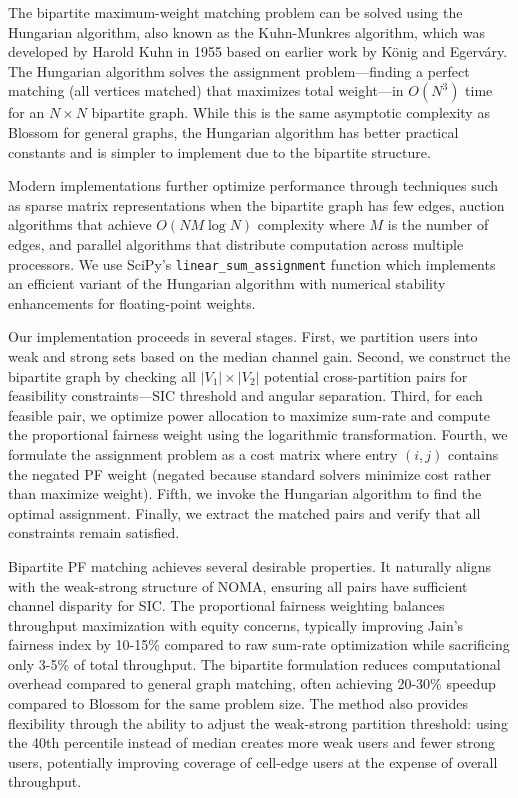 The bipartite maximum-weight matching problem can be solved using the Hungarian algorithm, also known as the Kuhn-Munkres algorithm, which was developed by Harold Kuhn in 1955 based on earlier work by König and Egerváry. The Hungarian algorithm solves the assignment problem—finding a perfect matching (all vertices matched) that maximizes total weight—in $O(N^3)$ time for an $N \times N$ bipartite graph. While this is the same asymptotic complexity as Blossom for general graphs, the Hungarian algorithm has better practical constants and is simpler to implement due to the bipartite structure.

Modern implementations further optimize performance through techniques such as sparse matrix representations when the bipartite graph has few edges, auction algorithms that achieve $O(NM \log N)$ complexity where $M$ is the number of edges, and parallel algorithms that distribute computation across multiple processors. We use SciPy's \texttt{linear\_sum\_assignment} function which implements an efficient variant of the Hungarian algorithm with numerical stability enhancements for floating-point weights.

Our implementation proceeds in several stages. First, we partition users into weak and strong sets based on the median channel gain. Second, we construct the bipartite graph by checking all $|V_1| \times |V_2|$ potential cross-partition pairs for feasibility constraints—SIC threshold and angular separation. Third, for each feasible pair, we optimize power allocation to maximize sum-rate and compute the proportional fairness weight using the logarithmic transformation. Fourth, we formulate the assignment problem as a cost matrix where entry $(i,j)$ contains the negated PF weight (negated because standard solvers minimize cost rather than maximize weight). Fifth, we invoke the Hungarian algorithm to find the optimal assignment. Finally, we extract the matched pairs and verify that all constraints remain satisfied.

Bipartite PF matching achieves several desirable properties. It naturally aligns with the weak-strong structure of NOMA, ensuring all pairs have sufficient channel disparity for SIC. The proportional fairness weighting balances throughput maximization with equity concerns, typically improving Jain's fairness index by 10-15\% compared to raw sum-rate optimization while sacrificing only 3-5\% of total throughput. The bipartite formulation reduces computational overhead compared to general graph matching, often achieving 20-30\% speedup compared to Blossom for the same problem size. The method also provides flexibility through the ability to adjust the weak-strong partition threshold: using the 40th percentile instead of median creates more weak users and fewer strong users, potentially improving coverage of cell-edge users at the expense of overall throughput.

